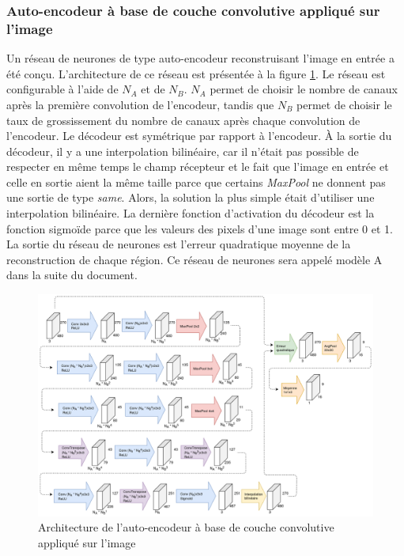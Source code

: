 \subsubsection{Auto-encodeur à base de couche convolutive appliqué sur l'image}
    Un réseau de neurones de type auto-encodeur reconstruisant l'image en entrée a été conçu. L'architecture de ce réseau est présentée à la figure \ref{fig:architecture_cnn_autoencoder}. Le réseau est configurable à l'aide de \(N_A\) et de \(N_B\). \(N_A\) permet de choisir le nombre de canaux après la première convolution de l'encodeur, tandis que \(N_B\) permet de choisir le taux de grossissement du nombre de canaux après chaque convolution de l'encodeur. Le décodeur est symétrique par rapport à l'encodeur. À la sortie du décodeur, il y a une interpolation bilinéaire, car il n'était pas possible de respecter en même temps le champ récepteur et le fait que l'image en entrée et celle en sortie aient la même taille parce que certains \textit{MaxPool} ne donnent pas une sortie de type \textit{same}. Alors, la solution la plus simple était d'utiliser une interpolation bilinéaire. La dernière fonction d'activation du décodeur est la fonction sigmoïde parce que les valeurs des pixels d'une image sont entre 0 et 1. La sortie du réseau de neurones est l'erreur quadratique moyenne de la reconstruction de chaque région. Ce réseau de neurones sera appelé modèle A dans la suite du document.
    \begin{figure}
        \centering
        \includegraphics[width=17cm]{images/Architecture_CnnAutoencoder.png}
        \caption{Architecture de l'auto-encodeur à base de couche convolutive appliqué sur l'image}
        \label{fig:architecture_cnn_autoencoder}
    \end{figure}

